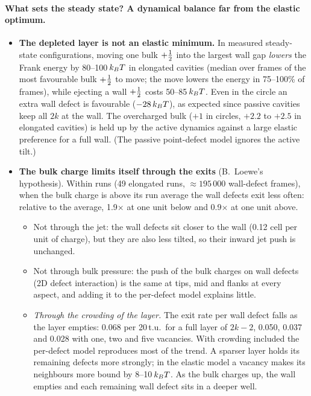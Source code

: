 \paragraph{What sets the steady state? A dynamical balance far from the elastic optimum.}
\begin{itemize}
  \item \textbf{The depleted layer is not an elastic minimum.} In measured steady-state configurations, moving one bulk $+\tfrac12$ into the largest wall gap \emph{lowers} the Frank
        energy by 80--100\,$k_BT$ in elongated cavities (median over frames of the most favourable bulk $+\tfrac12$ to move; the move lowers the energy in 75--100\% of frames), while ejecting a wall $+\tfrac12$ costs 50--85\,$k_BT$.
        Even in the circle an extra wall defect is favourable ($-28\,k_BT$), as expected since passive cavities keep all $2k$ at the wall. The overcharged bulk ($+1$ in circles,
        $+2.2$ to $+2.5$ in elongated cavities) is held up by the active dynamics against a large elastic preference for a full wall. (The passive point-defect model ignores the active tilt.)
  \item \textbf{The bulk charge limits itself through the exits} (B.~Loewe's hypothesis). Within runs (49 elongated runs, $\approx195\,000$ wall-defect frames), when the bulk charge is
        above its run average the wall defects exit less often: relative to the average, 1.9$\times$ at one unit below and 0.9$\times$ at one unit above.
        \begin{itemize}
          \item Not through the jet: the wall defects sit closer to the wall (0.12 cell per unit of charge), but they are also less tilted, so their inward jet push is unchanged.
          \item Not through bulk pressure: the push of the bulk charges on wall defects (2D defect interaction) is the same at tips, mid and flanks at every aspect, and adding it to the
                per-defect model explains little.
          \item \emph{Through the crowding of the layer.} The exit rate per wall defect falls as the layer empties: 0.068 per 20\,t.u.\ for a full layer of $2k-2$, 0.050, 0.037 and 0.028 with one,
                two and five vacancies. With crowding included the per-defect model reproduces most of the trend. A sparser layer holds its remaining defects more strongly; in the
                elastic model a vacancy makes its neighbours more bound by 8--10\,$k_BT$. As the bulk charges up, the wall empties and each remaining wall defect sits in a deeper well.

\end{itemize}
\end{itemize}
